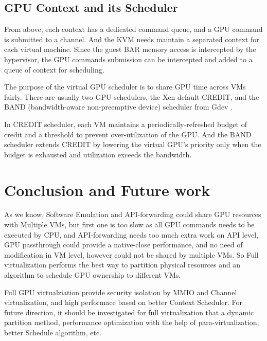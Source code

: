 \documentclass[a4paper,12pt]{article}
\begin{document}
\subsection{GPU Context and its Scheduler}

From above, each context has a dedicated command queue, and a GPU command is submitted to a channel. And the KVM needs maintain a separated context for each virtual machine. Since the guest BAR memory access is intercepted by the hypervisor, the GPU commands submission can be intercepted and added to a queue of context for scheduling. 

The purpose of the virtual GPU scheduler is to share GPU time across VMs fairly. There are usually two GPU schedulers, the Xen default CREDIT, and the BAND (bandwidth-aware non-preemptive device) scheduler from Gdev \cite{Hong:2017:GVS:3101309.3068281}. 

In CREDIT scheduler, each VM maintains a periodically-refreshed budget of credit and a threshold to
prevent over-utilization of the GPU. And the BAND scheduler extends CREDIT by lowering the virtual GPU’s priority only when the budget is exhausted and utilization exceeds the bandwidth.

\section{Conclusion and Future work}

As we know, Software Emulation and API-forwarding could share GPU resources with Multiple VMs, but first one is too slow as all GPU commands needs to be executed by CPU, and API-forwarding needs too much extra work on API level, GPU passthrough could provide a native-close performance, and no need of modification in VM level, however could not be shared by multiple VMs. So Full virtualization performs the best way to partition physical resources and an algorithm to schedule GPU ownership to different VMs.

Full GPU virtualziation provide security isolation by MMIO and Channel virtualization, and high performace based on better Context Scheduler. For future direction, it should be investigated for full virtualization that a dynamic partition method, performance optimization with the help of para-virtualization, better Schedule algorithm, etc. 
\medskip



\end{document}

